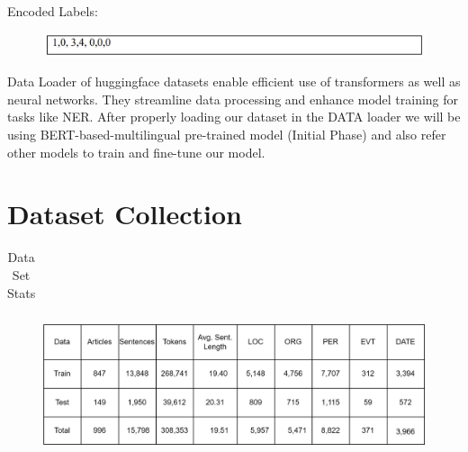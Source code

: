  Encoded Labels:  
 \begin{figure}[H]
\centering
\includegraphics [scale=0.8]{img/workingPrinciple/0101.png}

\end{figure}
 
Data Loader of huggingface datasets enable efficient use of transformers as well as neural networks. They streamline data processing and enhance model training for tasks like NER. 
After properly loading our dataset in the DATA loader we will be using BERT-based-multilingual pre-trained model (Initial Phase) and also refer other models to train and fine-tune our model.

 

\section{Dataset Collection}

\begin{table}[H]
  
\caption{Data Set Stats}
\label{tab: Data Set Stats}
    \centering
    
    \begin{tabular}{|c|c|c|}
    \end{tabular}
    
    
\end{table}

\begin{figure}[H]
\centering
\includegraphics [scale=0.9]{img/Graphics/Data Set Stats.png}

\end{figure}

